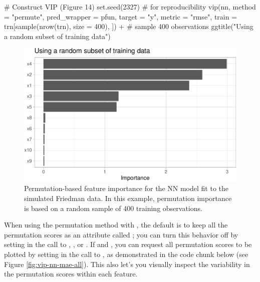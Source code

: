 \begin{Schunk}
\begin{Sinput}
# Construct VIP (Figure 14)
set.seed(2327)  # for reproducibility
vip(nn, method = "permute", pred_wrapper = pfun, target = "y", metric = "rmse",
    train = trn[sample(nrow(trn), size = 400), ]) +  # sample 400 observations
  ggtitle("Using a random subset of training data")
\end{Sinput}
\begin{figure}[!htb]

{\centering \includegraphics[width=0.7\linewidth]{greenwell-boehmke_files/figure-latex/vip-permute-nn-sample-1} 

}

\caption[Permutation-based feature importance for the NN model fit to the simulated Friedman data]{Permutation-based feature importance for the NN model fit to the simulated Friedman data. In this example, permutation importance is based on a random sample of 400 training observations.}\label{fig:vip-permute-nn-sample}
\end{figure}
\end{Schunk}

When using the permutation method with , the default is
to keep all the permutation scores as an attribute called
; you can turn this behavior off by setting
 in the call to , , or
. If  and , you can request
all permutation scores to be plotted by setting
 in the call to , as
demonstrated in the code chunk below (see Figure
\ref{fig:vip-nn-mae-all}). This also let's you visually inspect the
variability in the permutation scores within each feature.

